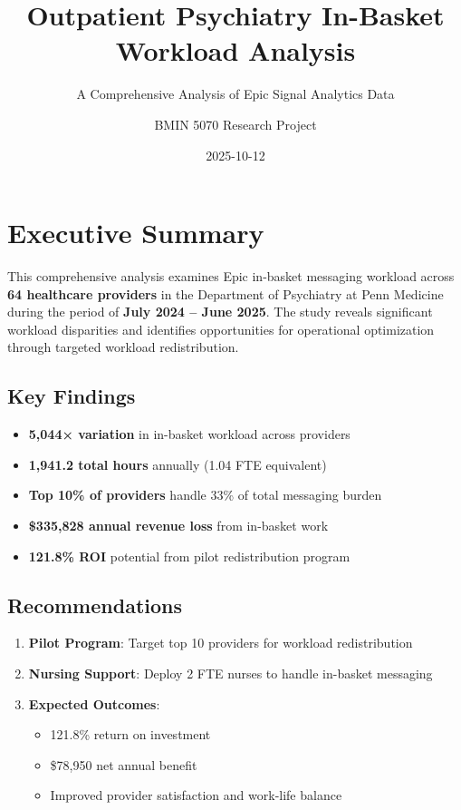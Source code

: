 \documentclass[
  11pt,
]{article}
\title{Outpatient Psychiatry In-Basket Workload Analysis}
\subtitle{A Comprehensive Analysis of Epic Signal Analytics Data}
\author{BMIN 5070 Research Project}
\date{2025-10-12}
\providecommand{\tightlist}{%
  \setlength{\itemsep}{0pt}\setlength{\parskip}{0pt}}\usepackage{longtable,booktabs,array}
\renewcommand*\contentsname{Table of contents}
\newcommand\contentsname{Table of contents}
\begin{document}
\maketitle

\renewcommand*\contentsname{Table of contents}
{
\hypersetup{linkcolor=}
\setcounter{tocdepth}{3}
\tableofcontents
}
\section{Executive Summary}\label{executive-summary}

This comprehensive analysis examines Epic in-basket messaging workload
across \textbf{64 healthcare providers} in the Department of Psychiatry
at Penn Medicine during the period of \textbf{July 2024 -- June 2025}.
The study reveals significant workload disparities and identifies
opportunities for operational optimization through targeted workload
redistribution.

\subsection{Key Findings}\label{key-findings}

\begin{itemize}
\tightlist
\item
  \textbf{5,044× variation} in in-basket workload across providers
\item
  \textbf{1,941.2 total hours} annually (1.04 FTE equivalent)
\item
  \textbf{Top 10\% of providers} handle 33\% of total messaging burden
\item
  \textbf{\$335,828 annual revenue loss} from in-basket work
\item
  \textbf{121.8\% ROI} potential from pilot redistribution program
\end{itemize}

\subsection{Recommendations}\label{recommendations}

\begin{enumerate}
\def\labelenumi{\arabic{enumi}.}
\tightlist
\item
  \textbf{Pilot Program}: Target top 10 providers for workload
  redistribution
\item
  \textbf{Nursing Support}: Deploy 2 FTE nurses to handle in-basket
  messaging
\item
  \textbf{Expected Outcomes}:

  \begin{itemize}
  \tightlist
  \item
    121.8\% return on investment
  \item
    \$78,950 net annual benefit
  \item
    Improved provider satisfaction and work-life balance
  \end{itemize}
\end{enumerate}
\end{document}
